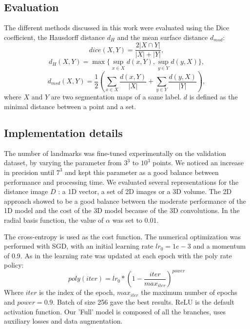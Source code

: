 \documentclass{article}
\begin{document}
\subsection{Evaluation}
The different methods discussed in this work were evaluated using the Dice coefficient,
the Hausdorff distance $d_H$ and the mean surface distance $d_{msd}$:
$$dice(X,Y) = \frac{2|X \cap Y|}{|X| + |Y|},$$
$$d_H(X,Y) = \max \{ \sup_{x \in \mathit{X}} d(x,Y), \sup_{y \in \mathit{Y}} d(y,X) \},$$
$$d_{msd}(X,Y) = \frac{1}{2}\left(\displaystyle\sum_{x \in \mathit{X}} \frac{d(x,Y)}{|\mathit{X}|} + \displaystyle\sum_{y \in \mathit{Y}} \frac{d(y,X)}{|\mathit{Y}|}\right),$$
where $\mathit{X}$ and $\mathit{Y}$ are two segmentation maps of a same label. $d$ is defined as the minimal distance between a point and a set.

\subsection{Implementation details}
The number of landmarks was fine-tuned experimentally on the validation dataset, by varying the parameter from $3^3$ to $10^3$ points. We noticed an increase in precision until $7^3$ and kept this parameter as a good balance between performance and processing time.
We evaluated several representations for the distance image $D$ : a 1D vector, a set of 2D images or a 3D volume.
The 2D approach showed to be a good balance between the moderate performance of the 1D model and the cost of the 3D model because of the 3D convolutions. In the radial basis function, the value of $\alpha$ was set to $0.01$.

The cross-entropy is used as the cost function. The numerical optimization was performed with SGD, with an initial learning rate $lr_0 = 1e-3$ and a momentum of 0.9. As in \cite{DBLP:journals/corr/ChenPK0Y16} the learning rate was updated at each epoch with the poly rate policy:
$$poly(iter) = lr_{0} *\left(1-\frac{iter}{max_{iter}}\right)^{power}$$
Where $iter$ is the index of the epoch, $max_{iter}$ the maximum number of epochs and $power=0.9$. Batch of size 256 gave the best results.
ReLU is the default activation function. Our 'Full' model is composed of all the branches, uses auxiliary losses and data augmentation.
\end{document}
